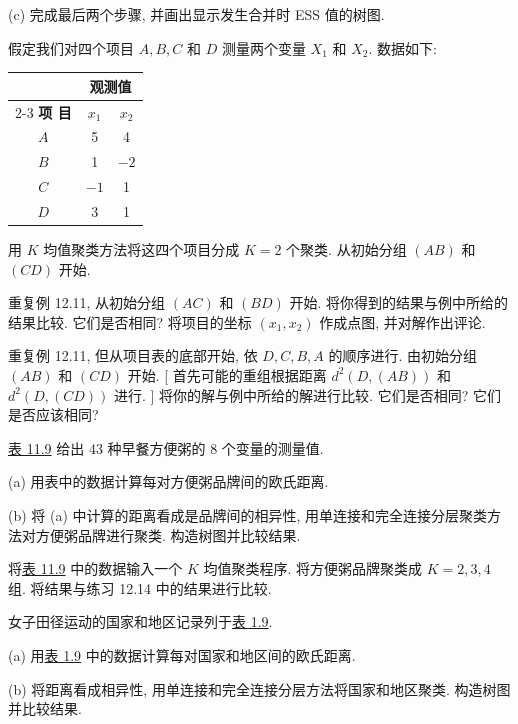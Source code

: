 
(c) 完成最后两个步骤, 并画出显示发生合并时 ESS 值的树图.

\quad 假定我们对四个项目 $A,B,C$ 和 $D$ 测量两个变量 $X_1$ 和 $X_2$. 数据如下:

\begin{mvtable}
\setlength{\tabcolsep}{6pt}%
\begin{tabular}{c|cc}
\toprule
& \multicolumn{2}{c}{观测值} \\
\cmidrule(lr){2-3}
\textbf{项 目} & $x_1$ & $x_2$ \\
\midrule
$A$ & 5 & 4 \\
$B$ & 1 & $-2$ \\
$C$ & $-1$ & 1 \\
$D$ & 3 & 1 \\
\bottomrule
\end{tabular}
\end{mvtable}

用 $K$ 均值聚类方法将这四个项目分成 $K=2$ 个聚类. 从初始分组 $(AB)$ 和 $(CD)$ 开始.

\quad 重复例 12.11, 从初始分组 $(AC)$ 和 $(BD)$ 开始. 将你得到的结果与例中所给的结果比较. 它们是否相同? 将项目的坐标 $(x_1,x_2)$ 作成点图, 并对解作出评论.

\quad 重复例 12.11, 但从项目表的底部开始, 依 $D,C,B,A$ 的顺序进行. 由初始分组 $(AB)$ 和 $(CD)$ 开始. [ 首先可能的重组根据距离 $d^2(D,(AB))$ 和 $d^2(D,(CD))$ 进行. ] 将你的解与例中所给的解进行比较. 它们是否相同? 它们是否应该相同?


\quad \hyperref[tab:11.9]{表 11.9} 给出 43 种早餐方便粥的 8 个变量的测量值.

\noindent (a) 用表中的数据计算每对方便粥品牌间的欧氏距离.

\noindent (b) 将 (a) 中计算的距离看成是品牌间的相异性, 用单连接和完全连接分层聚类方法对方便粥品牌进行聚类. 构造树图并比较结果.

\quad 将\hyperref[tab:11.9]{表 11.9} 中的数据输入一个 $K$ 均值聚类程序. 将方便粥品牌聚类成 $K=2,3,4$ 组. 将结果与练习 12.14 中的结果进行比较.

\quad 女子田径运动的国家和地区记录列于\hyperref[tab:1.9]{表 1.9}.

\noindent (a) 用\hyperref[tab:1.9]{表 1.9} 中的数据计算每对国家和地区间的欧氏距离.

\noindent (b) 将距离看成相异性, 用单连接和完全连接分层方法将国家和地区聚类. 构造树图并比较结果.

